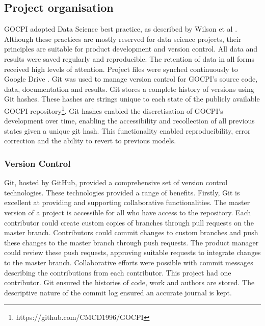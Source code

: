 \documentclass[10pt]{article}
\begin{document}
\subsection{Project organisation}
GOCPI adopted Data Science best practice, as described by Wilson et al \cite{J:10}. Although these practices are
mostly reserved for data science projects, their principles are suitable for product development and version control. All data and
results were saved regularly and reproducible. The retention of data in all forms received high levels of attention. Project files were synched
continuously to Google Drive \cite{Google_Drive}. Git \cite{Git} was used to manage version control for GOCPI's source code, data, documentation and results.
Git stores a complete history of versions using Git hashes. These hashes are strings unique to each state of the
publicly available GOCPI repository\footnote[1]{https://github.com/CMCD1996/GOCPI}. Git hashes enabled the discretisation of GOCPI's development over time,
enabling the accessibility and recollection of all previous states given a unique git hash. This functionality
enabled reproducibility, error correction and the ability to revert to previous models.

\subsubsection{Version Control}\label{Version Control}
Git, hosted by GitHub, provided a comprehensive set of version control technologies. These technologies provided a range of benefits.
Firstly, Git is excellent at providing and supporting collaborative functionalities. The master version of a project is accessible for all
who have access to the repository. Each contributor could create custom copies of branches through pull requests on the master branch. Contributors
could commit changes to custom branches and push these changes to the master branch through push requests. The product manager could review these push requests,
approving suitable requests to integrate changes to the master branch. Collaborative efforts were possible with
commit messages describing the contributions from each contributor. This project had one contributor. Git ensured the histories of code, work and authors are stored.
The descriptive nature of the commit log ensured an accurate journal is kept.
\end{document}
